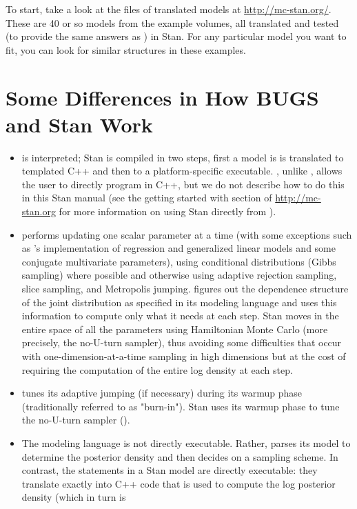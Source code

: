 To start, take a look at the files of translated \BUGS models at
\url{http://mc-stan.org/}.  These are 40 or so models from the \BUGS
example volumes, all translated and tested (to provide the same
answers as \BUGS) in Stan.  For any particular model you want to fit,
you can look for similar structures in these examples.

\section{Some Differences in How BUGS and Stan Work}

\begin{itemize}
\item \BUGS is interpreted; Stan is compiled in two steps, first a
  model is is translated to templated C++ and then to a
  platform-specific executable.  \Stan, unlike \BUGS, allows the user
  to directly program in C++, but we do not describe how to do this in
  this Stan manual (see the getting started with \Cpp section of
  \url{http://mc-stan.org} for more information on using Stan directly
  from \Cpp). 
\item \BUGS performs \MCMC updating one scalar parameter at a time
  (with some exceptions such as \JAGS's implementation of regression
  and generalized linear models and some conjugate multivariate
  parameters), using conditional distributions (Gibbs sampling) where
  possible and otherwise using adaptive rejection sampling, slice
  sampling, and Metropolis jumping.  \BUGS figures out the dependence
  structure of the joint distribution as specified in its modeling
  language and uses this information to compute only what it needs at
  each step.  Stan moves in the entire space of all the parameters
  using Hamiltonian Monte Carlo (more precisely, the no-U-turn
  sampler), thus avoiding some difficulties that occur with
  one-dimension-at-a-time sampling in high dimensions but at the cost
  of requiring the computation of the entire log density at each step.
\item \BUGS tunes its adaptive jumping (if necessary) during its
  warmup phase (traditionally referred to as "burn-in").  Stan uses
  its warmup phase to tune the no-U-turn sampler (\NUTS).
\item The \BUGS modeling language is not directly executable.  Rather,
  \BUGS parses its model to determine the posterior density and then
  decides on a sampling scheme.  In contrast, the statements in a Stan
  model are directly executable: they translate exactly into C++ code
  that is used to compute the log posterior density (which in turn is

\end{itemize}
